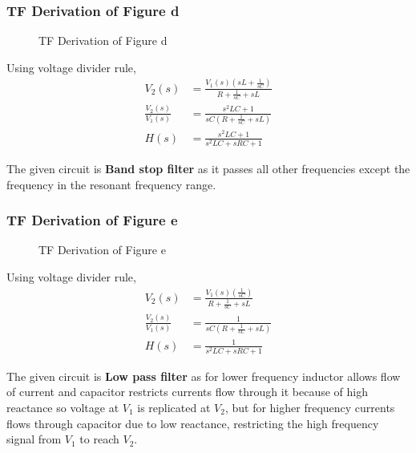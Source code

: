 \documentclass[a4paper,11pt]{article}
\begin{document}
\subsubsection{TF Derivation of Figure d}
\begin{figure}[H]
    \centering
    \figd \figds
    \caption{TF Derivation of Figure d}
\end{figure}


Using voltage divider rule,
\begin{equation*}
    \begin{aligned}
        V_2(s)                & =\frac{V_1(s)\left(sL+\frac{1}{sC}\right)}{R+\frac{1}{sC}+sL} \\
        \frac{V_2(s)}{V_1(s)} & =\frac{s^2LC+1}{sC\left(R+\frac{1}{sC}+sL\right)}             \\
        H(s)                  & =\frac{s^2LC+1}{s^2LC+sRC+1}
    \end{aligned}
\end{equation*}

The given circuit is \textbf{Band stop filter} as it passes all other frequencies except the frequency in the resonant frequency range.


\subsubsection{TF Derivation of Figure e}
\begin{figure}[H]
    \centering
    \fige \figes
    \caption{TF Derivation of Figure e}
\end{figure}


Using voltage divider rule,
\begin{equation*}
    \begin{aligned}
        V_2(s)                & =\frac{V_1(s)\left(\frac{1}{sC}\right)}{R+\frac{1}{sC}+sL} \\
        \frac{V_2(s)}{V_1(s)} & =\frac{1}{sC\left(R+\frac{1}{sC}+sL\right)}                \\
        H(s)                  & =\frac{1}{s^2LC+sRC+1}
    \end{aligned}
\end{equation*}

The given circuit is \textbf{Low pass filter} as for lower frequency inductor allows flow of current and  capacitor restricts currents flow through it because of high reactance  so voltage at $V_1$ is replicated at $V_2$, but for higher frequency currents flows through capacitor due to low reactance, restricting the high frequency signal from $V_1$ to reach $V_2$.
\end{document}
